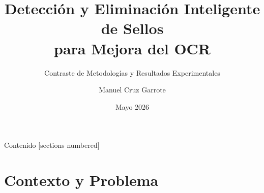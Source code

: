 \documentclass[aspectratio=169, 11pt]{beamer}
\title{Detección y Eliminación Inteligente de Sellos\\para Mejora del OCR}
\subtitle{Contraste de Metodologías y Resultados Experimentales}
\author{Manuel Cruz Garrote}
\institute{Universidad del Rosario}
\date{Mayo 2026}
\begin{document}

\begin{frame}[plain]
  \maketitle
\end{frame}

\begin{frame}{Contenido}
  [sections numbered]
  \tableofcontents[hideallsubsections]
\end{frame}

\section{Contexto y Problema}
\end{document}
